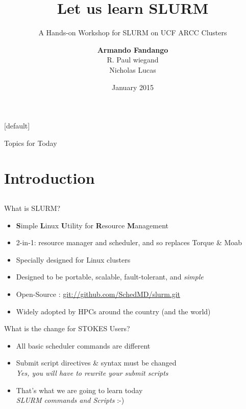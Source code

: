 \documentclass[10pt,compress]{beamer}
\author[Armando, Paul, Nicholas]{ \textbf{Armando Fandango} \\R. Paul wiegand \\Nicholas Lucas}
\title[SLURM]{\textbf{Let us learn SLURM}}
\subtitle{A Hands-on Workshop for SLURM on UCF ARCC Clusters}
\institute[ARCC, UCF]{
  Advanced Research Computing Center \\
  Institute for Simulation \& Training \\
  University of Central Florida
}
\date{January 2015}
\makeatletter
\newenvironment{withoutheadline}{
        \setbeamertemplate{headline}[default]
        \def\beamer@entrycode{\vspace*{-\headheight}}
    }{}
\makeatother
\begin{document}

\begin{frame}[plain]
\titlepage
\end{frame}

\begin{withoutheadline}
\begin{frame}{Topics for Today}
\tableofcontents
\end{frame}
\end{withoutheadline}

\section{Introduction}
\subsection*{}

\begin{frame}[<+->]{What is SLURM?}
\begin{itemize}\setlength{\itemsep}{1.5em}%
  \item \textbf{S}imple \textbf{L}inux \textbf{U}tility for \textbf{R}esource \textbf{M}anagement 
  \item 2-in-1: resource manager and scheduler, and so replaces Torque \& Moab
  \item Specially designed for Linux clusters 
  \item Designed to be portable, scalable, fault-tolerant, and \emph{simple}
  \item Open-Source : \url{git://github.com/SchedMD/slurm.git}	
  \item Widely adopted by HPCs around the country (and the world)
\end{itemize}
\end{frame}

\begin{frame}[<+->]{What is the change for STOKES Users?}
\begin{itemize}\setlength{\itemsep}{1.5em}%
  \item All basic scheduler commands are different
  \item Submit script directives \& syntax must be changed \\ \bigskip
  {\small\color{red} \textit{Yes, you will have to rewrite your submit scripts}}
  \item That's what we are going to learn today \\ \bigskip
  \textit{SLURM commands and Scripts} :-) 
\end{itemize}
\end{frame}
\end{document}
